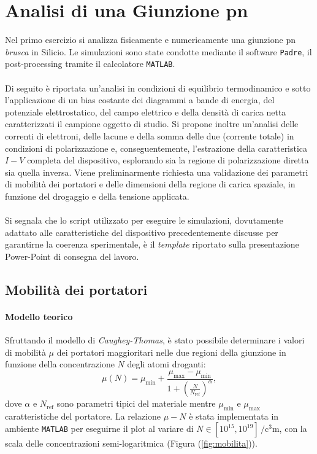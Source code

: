 \documentclass[a4paper,11pt]{report}
\begin{document}
\chapter{Analisi di una Giunzione pn}
\label{chap:pn}
Nel primo esercizio si analizza fisicamente e numericamente una giunzione pn \textit{brusca} in Silicio. Le simulazioni sono state condotte mediante il software \texttt{Padre}, il post-processing tramite il calcolatore \texttt{MATLAB}. \\
\\
Di seguito è riportata un'analisi in condizioni di equilibrio termodinamico e sotto l'applicazione di un bias costante dei diagrammi a bande di energia, del potenziale elettrostatico, del campo elettrico e della densità di carica netta caratterizzati il campione oggetto di studio. Si propone inoltre un'analisi delle correnti di elettroni, delle lacune e della somma delle due (corrente totale) in condizioni di polarizzazione e, conseguentemente, l'estrazione della caratteristica $I-V$ completa del dispositivo, esplorando sia la regione di polarizzazione diretta sia quella inversa.
Viene preliminarmente richiesta una validazione dei parametri di mobilità dei portatori e delle dimensioni della regione di carica spaziale, in funzione del drogaggio e della tensione applicata. \\
\\
Si segnala che lo script utilizzato per eseguire le simulazioni, dovutamente adattato alle caratteristiche del dispositivo precedentemente discusse per garantirne la coerenza sperimentale, è il \textit{template} riportato sulla presentazione Power-Point di consegna del lavoro. 

\section{Mobilità dei portatori}
\subsubsection{Modello teorico}
Sfruttando il modello di \textit{Caughey-Thomas}, è stato possibile determinare i valori di mobilità $\mu$ dei portatori maggioritari nelle due regioni della giunzione in funzione della concentrazione $N$ degli atomi droganti:
\begin{equation}
\mu(N) = \mu_{\text{min}} + \frac{\mu_{\text{max}} - \mu_{\text{min}}}{1 + \left( \frac{N}{N_{\text{ref}}} \right)^{\alpha}},
\label{eq1:caug:thom}
\end{equation}
dove $\alpha$ e $N_{\text{ref}}$ sono parametri tipici del materiale mentre $\mu_{\text{min}}$ e $\mu_{\text{max}}$ caratteristiche del portatore. La relazione $\mu-N$ è stata implementata in ambiente \texttt{MATLAB} per eseguirne il plot al variare di $N \in [10^{15}, 10^{19}] \, \si{\per\cubic\centi\meter}$, con la scala delle concentrazioni semi-logaritmica (Figura (\ref{fig:mobilita})). 
\end{document}
